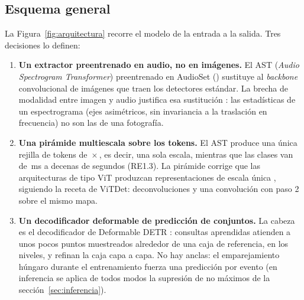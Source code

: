 \documentclass[12pt,a4paper]{article}
\begin{document}
\subsection{Esquema general}

La Figura~\ref{fig:arquitectura} recorre el modelo de la entrada a la salida. Tres decisiones
lo definen:

\begin{enumerate}
    \item \textbf{Un extractor preentrenado en audio, no en imágenes.} El AST
          (\emph{Audio Spectrogram Transformer}) preentrenado en AudioSet
          (\code{\astCheckpoint}) sustituye al \textit{backbone} convolucional de imágenes que
          traen los detectores estándar. La brecha de modalidad entre imagen y audio justifica
          esa sustitución \citep{zhu_sound_2025}: las estadísticas de un espectrograma (ejes
          asimétricos, sin invariancia a la traslación en frecuencia) no son las de una
          fotografía. 
    \item \textbf{Una pirámide multiescala sobre los tokens.} El AST produce una única rejilla
          de tokens de \tokensFreq{}\,$\times$\,\tokensTime{}, es decir, una sola escala,
          mientras que las clases van de \cellZero{}\,ms a decenas de segundos (RE1.3). La
          pirámide corrige que las arquitecturas de tipo ViT produzcan representaciones de
          escala única \citep{zhu_sound_2025}, siguiendo la receta de ViTDet: deconvoluciones y
          una convolución con paso 2 sobre el mismo mapa. 
    \item \textbf{Un decodificador deformable de predicción de conjuntos.} La cabeza es el
          decodificador de Deformable DETR \citep{zhu_deformable_2021}: \nQueries{} consultas
          aprendidas atienden a unos pocos puntos muestreados alrededor de una caja de
          referencia, en los \nLevels{} niveles, y refinan la caja capa a capa. No hay anclas:
          el emparejamiento húngaro durante el entrenamiento fuerza una predicción por evento
          (en inferencia se aplica de todos modos la supresión de no máximos de la
          sección~\ref{sec:inferencia}). 
\end{enumerate}
\end{document}
